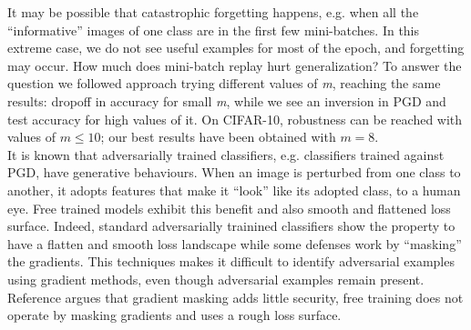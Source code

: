 \documentclass{article}
\begin{document}
It may be possible that catastrophic forgetting happens, e.g. when all the “informative” images of one class are in the first few mini-batches. In this extreme case, we do not see useful examples for most of the epoch, and forgetting may occur.
How much does mini-batch replay hurt generalization?
To answer the question we followed \cite{ShafahiEtAl2019b} approach trying different values of \textit{m}, reaching the same results: dropoff in accuracy for small \textit{m}, while we see an inversion in PGD and test accuracy for high values of it. On CIFAR-10, robustness can be reached with values of $m \leq 10$; our best results have been obtained with $m = 8$.\\
It is known that adversarially trained classifiers, e.g. classifiers trained against PGD,  have generative behaviours. When an image is perturbed from one class to another, it adopts features that make it “look” like its adopted class, to a human eye.
Free trained models exhibit this benefit and also smooth and flattened loss surface.
Indeed, standard adversarially trainined classifiers show the property to have a flatten and smooth loss landscape while some defenses work by “masking” the gradients. This techniques makes it difficult to identify
adversarial examples using gradient methods, even though adversarial examples remain present.
Reference \cite{EngstromEtAl2018} argues that gradient masking adds little security, free training does not operate by masking gradients and uses a rough loss surface.
\end{document}

